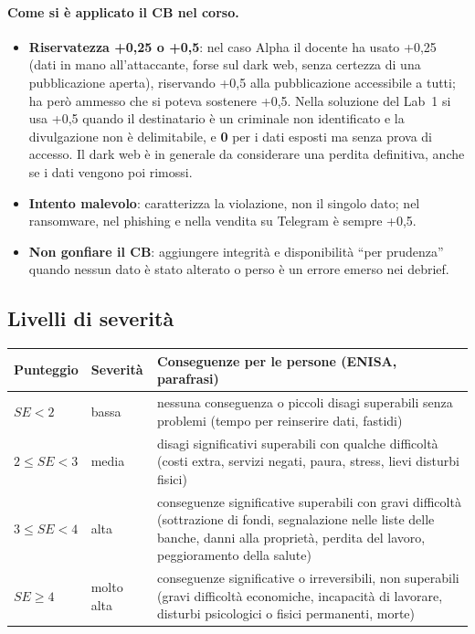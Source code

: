 \paragraph{Come si è applicato il CB nel corso.}
\begin{itemize}
  \item \textbf{Riservatezza +0,25 o +0,5}: nel caso Alpha il docente ha usato +0,25 (dati in mano
    all'attaccante, forse sul dark web, senza certezza di una pubblicazione aperta), riservando +0,5 alla
    pubblicazione accessibile a tutti; ha però ammesso che si poteva sostenere +0,5. Nella soluzione del
    Lab~1 si usa +0,5 quando il destinatario è un criminale non identificato e la divulgazione non è
    delimitabile, e \textbf{0} per i dati esposti ma senza prova di accesso. Il dark web è in generale da
    considerare una perdita definitiva, anche se i dati vengono poi rimossi.
  \item \textbf{Intento malevolo}: caratterizza la violazione, non il singolo dato; nel ransomware, nel
    phishing e nella vendita su Telegram è sempre +0,5.
  \item \textbf{Non gonfiare il CB}: aggiungere integrità e disponibilità ``per prudenza'' quando nessun
    dato è stato alterato o perso è un errore emerso nei debrief.
\end{itemize}

\subsection{Livelli di severità}
\label{sec:breach-livelli}
\begin{center}
\small
\begin{tabularx}{\linewidth}{>{\raggedright\arraybackslash}p{2.2cm} >{\raggedright\arraybackslash}p{1.8cm} X}
\toprule
\textbf{Punteggio} & \textbf{Severità} & \textbf{Conseguenze per le persone (ENISA, parafrasi)}\\
\midrule
$SE < 2$ & bassa & nessuna conseguenza o piccoli disagi superabili senza problemi (tempo per reinserire
  dati, fastidi)\\
$2 \le SE < 3$ & media & disagi significativi superabili con qualche difficoltà (costi extra, servizi
  negati, paura, stress, lievi disturbi fisici)\\
$3 \le SE < 4$ & alta & conseguenze significative superabili con gravi difficoltà (sottrazione di
  fondi, segnalazione nelle liste delle banche, danni alla proprietà, perdita del lavoro, peggioramento
  della salute)\\
$SE \ge 4$ & molto alta & conseguenze significative o irreversibili, non superabili (gravi difficoltà
  economiche, incapacità di lavorare, disturbi psicologici o fisici permanenti, morte)\\
\bottomrule
\end{tabularx}
\end{center}


